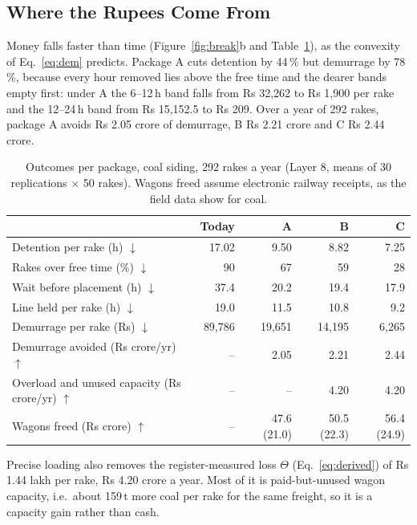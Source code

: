 \subsection{Where the Rupees Come From}
Money falls faster than time (Figure~\ref{fig:break}b and Table~\ref{tab:pack}), as the convexity of Eq.~\eqref{eq:dem} predicts. Package A cuts detention by 44\,\% but demurrage by 78\,\%, because every hour removed lies above the free time and the dearer bands empty first: under A the 6--12\,h band falls from Rs 32,262 to Rs 1,900 per rake and the 12--24\,h band from Rs 15,152.5 to Rs 209. Over a year of 292 rakes, package A avoids Rs 2.05 crore of demurrage, B Rs 2.21 crore and C Rs 2.44 crore.

\begin{table}[!htbp]
\centering
\caption[Outcomes per package, coal siding, 292 rakes a year]{Outcomes per package, coal siding, 292 rakes a year (Layer 8, means of 30 replications $\times$ 50 rakes). Wagons freed assume electronic railway receipts, as the field data show for coal.}
\label{tab:pack}
\small
\begin{tabular}{@{}lrrrr@{}}
\toprule
 & \textbf{Today} & \textbf{A} & \textbf{B} & \textbf{C} \\
\midrule
Detention per rake (h) $\downarrow$ & 17.02 & 9.50 & 8.82 & 7.25 \\
Rakes over free time (\%) $\downarrow$ & 90 & 67 & 59 & 28 \\
Wait before placement (h) $\downarrow$ & 37.4 & 20.2 & 19.4 & 17.9 \\
Line held per rake (h) $\downarrow$ & 19.0 & 11.5 & 10.8 & 9.2 \\
Demurrage per rake (Rs) $\downarrow$ & 89,786 & 19,651 & 14,195 & 6,265 \\
Demurrage avoided (Rs crore/yr) $\uparrow$ & -- & 2.05 & 2.21 & 2.44 \\
Overload and unused capacity (Rs crore/yr) $\uparrow$ & -- & -- & 4.20 & 4.20 \\
Wagons freed (Rs crore) $\uparrow$ & -- & 47.6 (21.0) & 50.5 (22.3) & 56.4 (24.9) \\
\bottomrule
\end{tabular}
\end{table}

Precise loading also removes the register-measured loss $\Theta$ (Eq.~\eqref{eq:derived}) of Rs 1.44 lakh per rake, Rs 4.20 crore a year. Most of it is paid-but-unused wagon capacity, i.e.\ about 159\,t more coal per rake for the same freight, so it is a capacity gain rather than cash.

